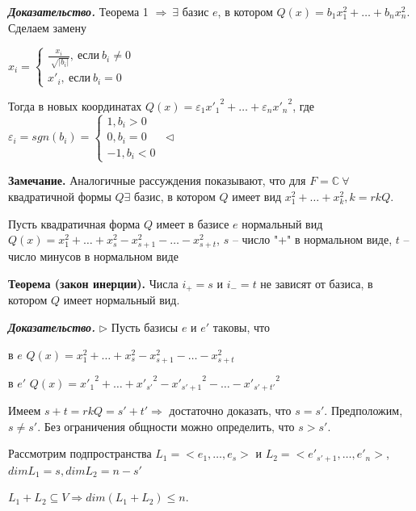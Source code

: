 \vspace{\baselineskip}
\textbf{\textit{Доказательство.}} Теорема 1 $\Rightarrow \ \exists$ базис $e$, в котором $Q(x) = b_1 x_1^2 + \dots + b_n x_n^2$. Сделаем замену

$ x_i = \begin{cases}
		\frac{x_i}{\sqrt[]{|b_i|}}, \ если \ b_i \neq 0 \\
		x'_i, \ если \ b_i = 0
	\end{cases}$

Тогда в новых координатах $Q(x) = \varepsilon_1 {x'_1}^2 + \dots + \varepsilon_n {x'_n}^2$, где $\varepsilon_i = sgn(b_i) = \begin{cases}
		1, b_i > 0 \\
		0, b_i = 0 \\
        -1, b_i < 0 
	\end{cases} \ \lhd$
    

\vspace{\baselineskip}
\textbf{Замечание.} Аналогичные рассуждения показывают, что для $F = \mathbb{C} \ \forall$ квадратичной формы $Q \exists$ базис, в котором $Q$ имеет вид $x_1^2 + \dots + x_k^2, k = rkQ$.

\vspace{\baselineskip}
Пусть квадратичная форма $Q$ имеет в базисе $e$ нормальный вид $Q(x) = x_1^2 + \dots + x_s^2 - x_{s+1}^2 - \dots - x_{s+t}^2$, $s$ -- число "+" в нормальном виде, $t$ -- число минусов в нормальном виде

\vspace{\baselineskip}
\textbf{Теорема (закон инерции).} Числа $i_+ = s$ и $i_- = t$ не зависят от базиса, в котором $Q$ имеет нормальный вид.

\vspace{\baselineskip}
\textbf{\textit{Доказательство.}} $\rhd$ Пусть базисы $e$ и $e'$ таковы, что 

в $e$ $Q(x) = x_1^2 + \dots + x_s^2 - x_{s+1}^2 - \dots - x_{s+t}^2$

в $e'$ $Q(x) = {x'_1}^2 + \dots + {x'_{s'}}^2 - {x'_{s'+1}}^2 - \dots - {x'_{s'+ t'}}^2$

Имеем $s + t = rkQ = s' + t' \Rightarrow$ достаточно доказать, что $s = s'$. Предположим, $s \neq s'$. Без ограничения общности можно определить, что $s > s'$.

Рассмотрим подпространства $L_1 = <e_1, \dots, e_s>$ и $L_2 = <e'_{s'+1}, \dots, e'_n>$, $dimL_1 = s, dimL_2 = n-s'$

$L_1 + L_2 \subseteq V \Rightarrow dim (L_1 + L_2) \leq n$.

